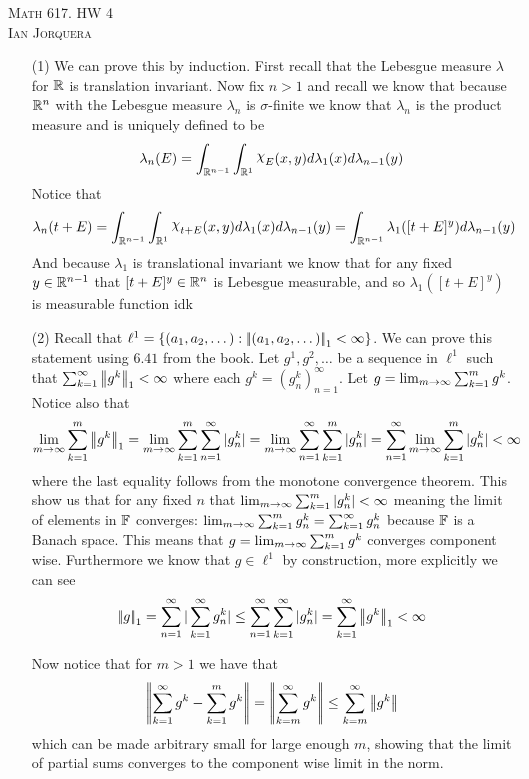 \documentclass[12pt]{amsart}
\DeclareRobustCommand{\rchi}{{\mathpalette\irchi\relax}}
\newcommand{\irchi}[2]{\raisebox{\depth}{$#1\chi$}} %
\begin{document}
\begin{center}
   \textsc{Math 617. HW 4\\ Ian Jorquera}
\end{center}
\vspace{1em}

\begin{itemize}
   \item[(1)] %
   We can prove this by induction. First recall that the Lebesgue 
   measure $\lambda$ for $\mathbb{R}$ is translation invariant.
   Now fix $n>1$ and recall we know that because $\mathbb{R}^n$ with the Lebesgue 
   measure $\lambda_n$ is $\sigma$-finite we know that $\lambda_n$ is the product measure and
   is uniquely defined to be 
   \[\lambda_n(E)=\int_{\R^{n-1}}\int_{\R^{1}}\rchi_{E}(x,y)d\lambda_1(x)d\lambda_{n-1}(y)\]
   Notice that 
   \[\lambda_n(t+E)=\int_{\R^{n-1}}\int_{\R^{1}}\rchi_{t+E}(x,y)d\lambda_1(x)d\lambda_{n-1}(y)
   = \int_{\R^{n-1}}\lambda_1([t+E]^y) d\lambda_{n-1}(y)\]
   And because $\lambda_1$ is translational invariant we know that for any fixed $y\in\mathbb{R}^{n-1}$ that 
   $[t+E]^y\in \mathbb{R}^n$ is Lebesgue measurable, and so $\lambda_1([t+E]^y)$ is measurable function idk

   \item[(2)] %
   Recall that $\ell^1=\{(a_1,a_2,\dots) : \norm{(a_1,a_2,\dots)}_1<\infty \}$. We can prove this 
   statement using $6.41$ from the book. Let $g^1,g^2,\dots $ be a sequence in $\ell^1$ such that 
   $\sum_{k=1}^\infty\norm{g^k}_1<\infty$ where each $g^k=(g^k_n)_{n=1}^\infty$. 
   Let $g=\lim_{m\rightarrow\infty}\sum_{k=1}^m g^k$.
   Notice also that
   \[\lim_{m\ra\infty}\sum_{k=1}^m\norm{g^k}_1=\lim_{m\ra\infty}\sum_{k=1}^m\sum_{n=1}^\infty |g^k_n|
   =\lim_{m\ra\infty}\sum_{n=1}^\infty \sum_{k=1}^m|g^k_n|
   =\sum_{n=1}^\infty \lim_{m\ra\infty}\sum_{k=1}^m|g^k_n|<\infty\]
   where the last equality follows from the monotone convergence theorem. This show us that for any fixed $n$ 
   that $\lim_{m\rightarrow\infty}\sum_{k=1}^m|g^k_n|<\infty$ meaning the limit of elements in 
   $\mathbb{F}$ converges: $\lim_{m\rightarrow\infty}\sum_{k=1}^m g^k_n=\sum_{k=1}^\infty g^k_n$ because $\mathbb{F}$ is a Banach space.
   This means that $g=\lim_{m\rightarrow\infty}\sum_{k=1}^m g^k$ converges component wise. Furthermore we know that $g\in\ell^1$ by construction, more explicitly we can see 
   \[\norm{g}_1=\sum_{n=1}^\infty|\sum_{k=1}^{\infty}g^k_n|\leq\sum_{n=1}^\infty\sum_{k=1}^{\infty}|g^k_n|=\sum_{k=1}^\infty\norm{g^k}_1<\infty\]



   Now notice that for $m>1$ we have that 
   \[\norm{\sum_{k=1}^\infty g^k-\sum_{k=1}^m g^k}=\norm{\sum_{k=m}^\infty g^k}\leq \sum_{k=m}^\infty\norm{g^k}\]
   which can be made arbitrary small for large enough $m$, showing that the limit of partial sums converges to the component wise limit in the norm.
    

\end{itemize}
\end{document}

